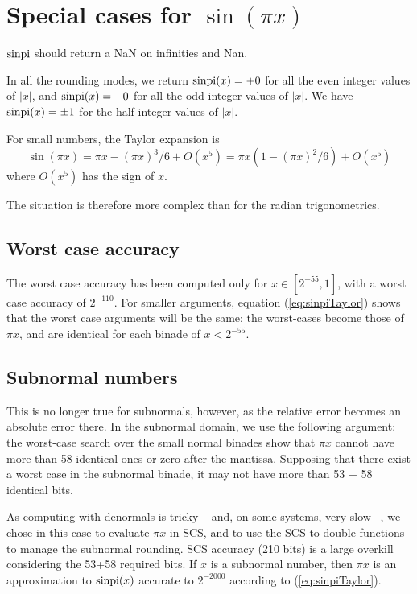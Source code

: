 \section{Special cases for $\sin(\pi x)$}
$\operatorname{sinpi}$ should return a NaN on infinities and Nan.

In all the rounding modes, we return $\operatorname{sinpi}(x)=+0$ for all the even
integer values of $|x|$, and $\operatorname{sinpi}(x)=-0$ for all the odd integer
values of $|x|$. We have $\operatorname{sinpi}(x)=\pm 1$ for  the half-integer
values of $|x|$. 

For small numbers, the Taylor expansion is
\begin{equation}
  \sin(\pi x) = \pi x - (\pi x)^3/6 + O(x^5) = \pi x(1-(\pi
  x)^2/6) + O(x^5)\label{eq:sinpiTaylor}
\end{equation}
  where $O(x^5)$ has the sign of $x$. 

The situation is therefore more complex than for the radian
trigonometrics.

\subsection{Worst case accuracy}

The worst case accuracy has been computed only for $x \in [2^{-55},
1]$, with a worst case accuracy of $2^{-110}$. For smaller arguments,
equation (\ref{eq:sinpiTaylor}) shows that the worst case arguments
will be the same: the worst-cases become those of $\pi x$, and are
identical for each binade of $x<2^{-55}$.  

\subsection{Subnormal numbers}
This is no longer true for subnormals, however, as the relative error
becomes an absolute error there. In the subnormal domain, we use the
following argument: the worst-case search over the small normal
binades show that $\pi x$ cannot have more than 58 identical ones or
zero after the mantissa.  Supposing that there exist a worst case in
the subnormal binade, it may not have more than 53 + 58 identical
bits.

As computing with denormals is tricky -- and, on some systems, very
slow --, we chose in this case to evaluate $\pi x$ in SCS, and to use
the SCS-to-double functions to manage the subnormal rounding. SCS
accuracy (210 bits) is a large overkill considering the 53+58 required
bits. If $x$ is a subnormal number, then $\pi x$ is an approximation to
$\operatorname{sinpi}(x)$ accurate to $2^{-2000}$ according to
(\ref{eq:sinpiTaylor}). 



